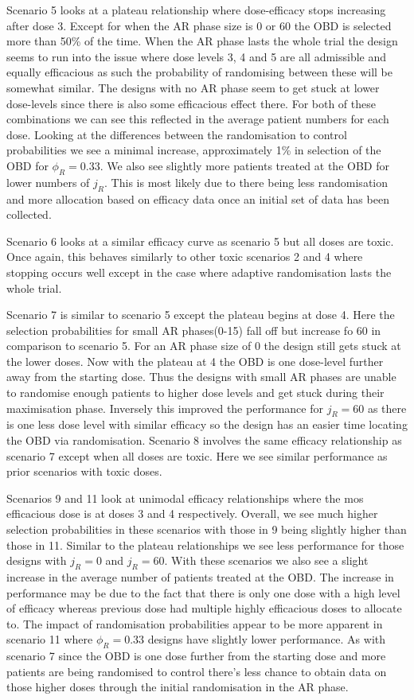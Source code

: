 Scenario 5 looks at a plateau relationship where dose-efficacy stops increasing after dose 3. Except for when the AR phase size is 0 or 60 the OBD is selected more than 50\% of the time. When the AR phase lasts the whole trial the design seems to run into the issue where dose levels 3, 4 and 5 are all admissible and equally efficacious as such the probability of randomising between these will be somewhat similar. The designs with no AR phase seem to get stuck at lower dose-levels since there is also some efficacious effect there. For both of these combinations we can see this reflected in the average patient numbers for each dose. Looking at the differences between the randomisation to control probabilities we see a minimal increase, approximately 1\% in selection of the OBD for $\phi_R = 0.33$. We also see slightly more patients treated at the OBD for lower numbers of $j_R$. This is most likely due to there being less randomisation and more allocation based on efficacy data once an initial set of data has been collected. 

Scenario 6 looks at a similar efficacy curve as scenario 5 but all doses are toxic. Once again, this behaves similarly to other toxic scenarios 2 and 4 where stopping occurs well except in the case where adaptive randomisation lasts the whole trial. 

Scenario 7 is similar to scenario 5 except the plateau begins at dose 4. Here the selection probabilities for small AR phases(0-15) fall off but increase fo 60 in comparison to scenario 5. For an AR phase size of 0 the design still gets stuck at the lower doses. Now with the plateau at 4 the OBD is one dose-level further away from the starting dose. Thus the designs with small AR phases are unable to randomise enough patients to higher dose levels and get stuck during their maximisation phase. Inversely this improved the performance for $j_R = 60$ as there is one less dose level with similar efficacy so the design has an easier time locating the OBD via randomisation. Scenario 8 involves the same efficacy relationship as scenario 7 except when all doses are toxic. Here we see similar performance as prior scenarios with toxic doses.  

Scenarios 9 and 11 look at unimodal efficacy relationships where the mos efficacious dose is at doses 3 and 4 respectively. Overall, we see much higher selection probabilities in these scenarios with those in 9 being slightly higher than those in 11. Similar to the plateau relationships we see less performance for those designs with $j_R = 0$ and  $j_R = 60$. With these scenarios we also see a slight increase in the average number of patients treated at the OBD. The increase in performance may be due to the fact that there is only one dose with a high level of efficacy whereas previous dose had multiple highly efficacious doses to allocate to. The impact of randomisation probabilities appear to be more apparent in scenario 11 where $\phi_R = 0.33$ designs have slightly lower performance. As with scenario 7 since the OBD is one dose further from the starting dose and more patients are being randomised to control there's less chance to obtain data on those higher doses through the initial randomisation in the AR phase. 

